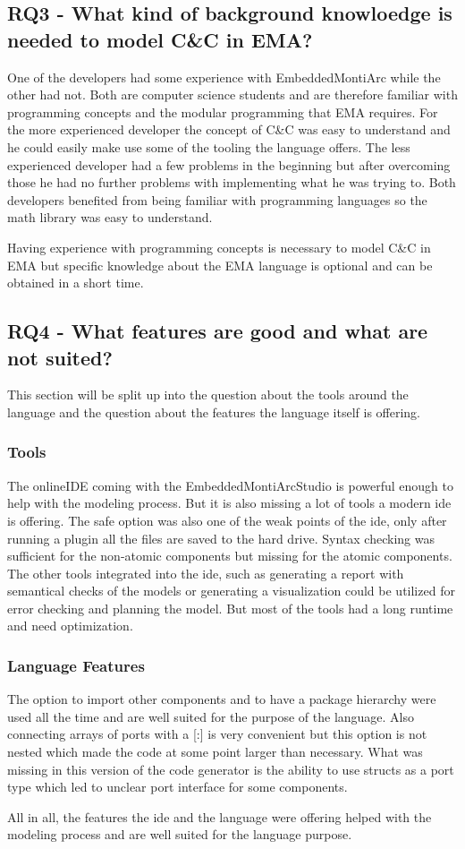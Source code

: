 \subsection{RQ3 - What kind of background knowloedge is needed to model C\&C in EMA?}
One of the developers had some experience with EmbeddedMontiArc while the other had not. Both are computer science students and are therefore familiar with programming concepts and the modular programming that EMA requires. For the more experienced developer the concept of C\&C was easy to understand and he could easily make use some of the tooling the language offers. The less experienced developer had a few problems in the beginning but after overcoming those he had no further problems with implementing what he was trying to. Both developers benefited from being familiar with programming languages so the math library was easy to understand. 

Having experience with programming concepts is necessary to model C\&C in EMA but specific knowledge about the EMA language is optional and can be obtained in a short time.

\subsection{RQ4 - What features are good and what are not suited?}
This section will be split up into the question about the tools around the language and the question about the features the language itself is offering.

\subsubsection{Tools}
The onlineIDE coming with the EmbeddedMontiArcStudio is powerful enough to help with the modeling process. But it is also missing a lot of tools a modern ide is offering. The safe option was also one of the weak points of the ide, only after running a plugin all the files are saved to the hard drive. Syntax checking was sufficient for the non-atomic components but missing for the atomic components. The other tools integrated into the ide, such as generating a report with semantical checks of the models or generating a visualization could be utilized for error checking and planning the model. But most of the tools had a long runtime and need optimization.

\subsubsection{Language Features}
The option to import other components and to have a package hierarchy were used all the time and are well suited for the purpose of the language. Also connecting arrays of ports with a [:] is very convenient but this option is not nested which made the code at some point larger than necessary. What was missing in this version of the code generator is the ability to use structs as a port type which led to unclear port interface for some components.

All in all, the features the ide and the language were offering helped with the modeling process and are well suited for the language purpose.





